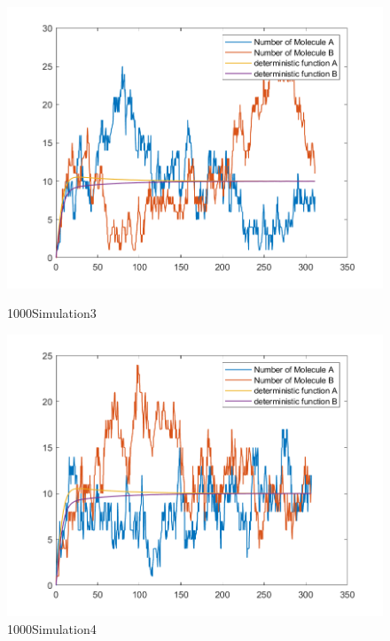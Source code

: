\documentclass{article}
\begin{document}
\begin{figure}[htbp]
    \centering
    \begin{minipage}{0.45\linewidth}
        \centering
        \includegraphics[width=\linewidth]{graph/b3.png}
        \caption{1000Simulation3}
        \label{b3}
    \end{minipage}
    \hfill
    \begin{minipage}{0.45\linewidth}
        \centering
        \includegraphics[width=\linewidth]{graph/b4.png}
        \caption{1000Simulation4}
        \label{b4}
    \end{minipage}
\end{figure}
\end{document}

